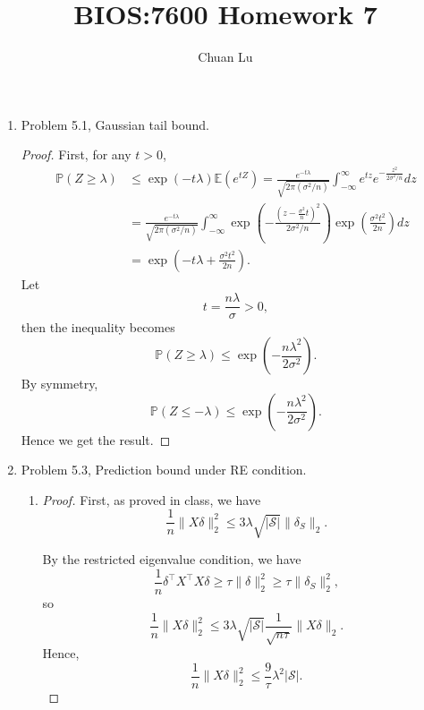 \documentclass{article}
\begin{document}
\author{Chuan Lu}
\title{BIOS:7600 Homework 7}
\maketitle

\medskip

\begin{enumerate}

\item Problem 5.1, Gaussian tail bound.

\begin{proof}
First, for any $t > 0$,
\begin{equation}
\begin{aligned}
\mathbb{P}(Z \ge \lambda) &\le \exp(-t\lambda)\mathbb{E}(e^{tZ}) = \frac{e^{-t\lambda}}{\sqrt{2\pi(\sigma^2/n)}}\int_{-\infty}^{\infty}e^{tz}e^{-\frac{z^2}{2\sigma^2/n}} dz \\
&= \frac{e^{-t\lambda}}{\sqrt{2\pi(\sigma^2/n)}}\int_{-\infty}^{\infty}\exp(-\frac{(z-\frac{\sigma^2}{n}t)^2}{2\sigma^2/n})\exp(\frac{\sigma^2 t^2}{2n})dz\\ 
&=\exp(-t\lambda + \frac{\sigma^2t^2}{2n}).
\end{aligned}
\end{equation}
Let
\begin{equation}
t = \frac{n\lambda}{\sigma} > 0,
\end{equation}
then the inequality becomes
\begin{equation}
\mathbb{P}(Z \ge \lambda) \le \exp(-\frac{n\lambda^2}{2\sigma^2}).
\end{equation}
By symmetry, 
\begin{equation}
\mathbb{P}(Z \le -\lambda) \le \exp(-\frac{n\lambda^2}{2\sigma^2}).
\end{equation}
Hence we get the result.
\end{proof}

\item Problem 5.3, Prediction bound under RE condition.

\begin{enumerate}
\item 
\begin{proof}
First, as proved in class, we have
\begin{equation}
\frac{1}{n}\lVert X\delta \rVert_2^2\le 3\lambda \sqrt{|\mathcal{S}|}\lVert \delta_S\rVert_2.
\end{equation}

By the restricted eigenvalue condition, we have 
\begin{equation}
\frac{1}{n}\delta^\top X^\top X\delta \ge \tau\lVert \delta\rVert_2^2\ge \tau\lVert \delta_S\rVert_2^2,
\end{equation}
so
\begin{equation}
\frac{1}{n}\lVert X\delta \rVert_2^2\le 3\lambda\sqrt{|\mathcal{S}|}\frac{1}{\sqrt{n\tau}}\lVert X\delta\rVert_2.
\end{equation}
Hence,
\begin{equation}
\frac{1}{n}\lVert X\delta \rVert_2^2 \le \frac{9}{\tau}\lambda^2|\mathcal{S}|.
\end{equation}
\end{proof}


\end{enumerate}
\end{enumerate}
\end{document}

